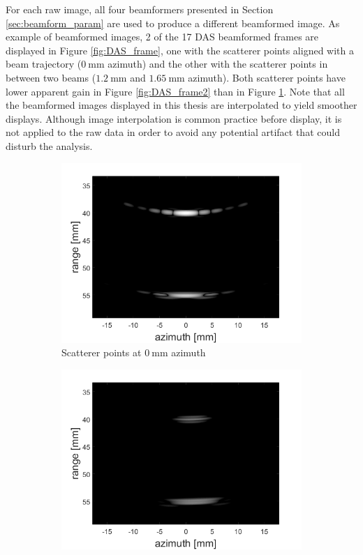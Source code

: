 For each raw image, all four beamformers presented in Section \ref{sec:beamform_param} are used to produce a different beamformed image. As example of beamformed images, 2 of the 17 DAS beamformed frames are displayed in Figure \ref{fig:DAS_frame}, one with the scatterer points aligned with a beam trajectory ($0~$mm azimuth) and the other with the scatterer points in between two beams ($1.2~$mm and $1.65~$mm azimuth). Both scatterer points have lower apparent gain in Figure \ref{fig:DAS_frame2} than in Figure \ref{fig:DAS_frame1}.
Note that all the beamformed images displayed in this thesis are interpolated to yield smoother displays.
Although image interpolation is common practice before display, it is not applied to the raw data in order to avoid any potential artifact that could disturb the analysis.

\begin{figure}[ht]
    \centering
    \begin{subfigure}[t]{0.48\linewidth}
        \includegraphics[width=\linewidth]{./images/results/1/DAS_frame1.png}
        \caption{Scatterer points at $0~$mm azimuth}
        \label{fig:DAS_frame1}
    \end{subfigure}
    \quad
    \begin{subfigure}[t]{0.48\linewidth}
        \includegraphics[width=\linewidth]{./images/results/1/DAS_frame2.png}

\end{subfigure}
\end{figure}
